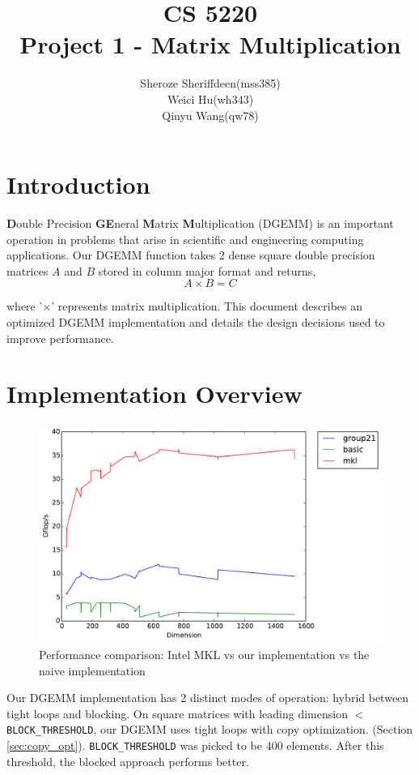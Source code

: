 \documentclass[11pt]{article}
\begin{document}
\title{CS 5220\\ Project 1 - Matrix Multiplication}
\author{Sheroze Sheriffdeen(mss385)\\ Weici Hu(wh343)\\  Qinyu Wang(qw78)}
\maketitle

\section{Introduction}
\textbf{D}ouble Precision \textbf{GE}neral \textbf{M}atrix \textbf{M}ultiplication (DGEMM) is an important operation in problems that arise in scientific and engineering computing applications. Our DGEMM function takes 2 dense square double precision matrices $A$ and $B$ stored in column major format and returns,
	\begin{equation} 
		A \times B = C
	\end{equation}
	
	where '$\times$' represents matrix multiplication. This document describes an optimized DGEMM implementation and details the design decisions used to improve performance. 

\section{Implementation Overview}
\begin{figure}[H]
\centering
\includegraphics[scale=0.6]{growth_final.pdf}
\caption{Performance comparison: Intel MKL vs our implementation vs the naive implementation}
\end{figure}
\newpage
Our DGEMM implementation has 2 distinct modes of operation: hybrid between tight loops and blocking. On square matrices with leading dimension $<$ \texttt{BLOCK\_THRESHOLD}, our DGEMM uses tight loops with copy optimization. (Section \ref{sec:copy_opt}). \texttt{BLOCK\_THRESHOLD} was picked to be 400 elements. After this threshold, the blocked approach performs better. \\
\end{document}
